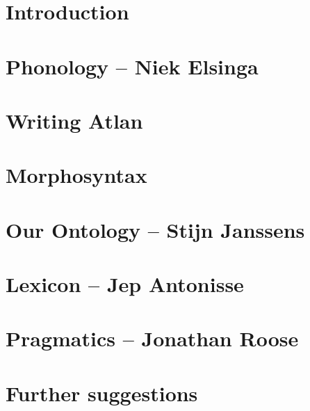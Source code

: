 \documentclass[twoside, openany, 12pt, a5paper]{book}
\begin{document}
\frontmatter






\mainmatter

\restoregeometry
\chapter{Introduction}

\chapter{Phonology -- {\small Niek Elsinga}}

\chapter{Writing Atlan}

\chapter{Morphosyntax}

\chapter{Our Ontology -- {\small Stijn Janssens}}

\chapter{Lexicon -- {\small Jep Antonisse}}


\chapter{Pragmatics -- {\small Jonathan Roose}}

\chapter{Further suggestions}
\end{document}
